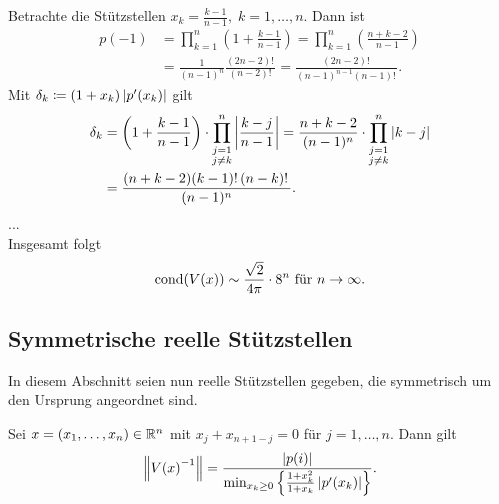 \begin{example}
    Betrachte die Stützstellen $x_k = \frac{k-1}{n-1}, \; k=1, \dots, n$.
    Dann ist
    \[
        \begin{split}
            p(-1)
            &= \prod_{k=1}^{n} \left( 1 + \frac{k-1}{n-1} \right)
            = \prod_{k=1}^{n} \left( \frac{n + k - 2}{n-1} \right)\\
            &= \frac{1}{(n-1)^n} \frac{(2n-2)!\,}{(n-2)!\,}
            = \frac{(2n-2)!\,}{(n-1)^{n-1}(n-1)!\,}.
        \end{split}
    \]
    Mit $\delta_k \coloneqq (1 + x_k) \left\lvert  p^{\prime}(x_k)  \right\rvert$ gilt
    \[
        \begin{split}
            \delta_k
            &= \left( 1 + \frac{k-1}{n-1} \right) \cdot \prod_{\substack{j=1\\ j\neq k}}^{n} \left\lvert  \frac{k-j}{n-1}  \right\rvert
            = \frac{n+k-2}{(n-1)^{n}} \cdot \prod_{\substack{j=1\\ j\neq k}}^{n} \left\lvert  k-j  \right\rvert\\
            &= \frac{(n+k-2)(k-1)!\, (n-k)!\,}{(n-1)^{n}} .
        \end{split}
    \]
    ...\\ %
    Insgesamt folgt
    \[
        \text{cond$ \left( \text{$V(x)$} \right)$} \sim \frac{\sqrt{2}}{4\pi} \cdot 8^n \text{ für } n \rightarrow \infty.
    \]
\end{example}

\subsection{Symmetrische reelle Stützstellen}
In diesem Abschnitt seien nun reelle Stützstellen gegeben, die symmetrisch um
den Ursprung angeordnet sind.

\begin{lemma}
    Sei $x = (x_1, \dots, x_n) \in \mathbb{R}^n$ mit $x_j + x_{n+1-j} = 0$ für $j = 1, \dots, n$.
    Dann gilt
    \[
        \left\lVert \text{$V(x)$}^{-1} \right\rVert = \frac{\left\lvert p(i) \right\rvert}{\min_{x_k \geq 0} \left\{ \frac{1 + x_k^2}{1 + x_k} \left\lvert p^{\prime}(x_k) \right\rvert \right\} }.
    \]
\end{lemma}
